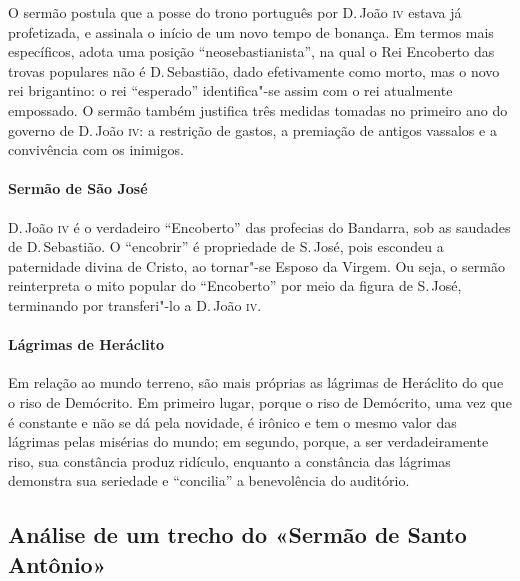 O sermão postula que a posse do trono português por D.\,João \textsc{iv} estava já profetizada, e assinala o início de um novo tempo de bonança. Em termos mais específicos, adota uma posição ``neosebastianista'', na qual o Rei Encoberto das trovas populares não é D.\,Sebastião, dado efetivamente como morto, mas o novo rei brigantino: o rei ``esperado'' identifica"-se assim com o rei atualmente empossado. O sermão também justifica três medidas tomadas no primeiro ano do governo de D.\,João \textsc{iv}: a restrição de gastos, a premiação de antigos
vassalos e a convivência com os inimigos.

\paragraph{Sermão de São José}

D.\,João \textsc{iv} é o verdadeiro ``Encoberto'' das profecias do Bandarra, sob as saudades de D.\,Sebastião. O ``encobrir'' é propriedade de S.\,José, pois escondeu a paternidade divina de Cristo, ao tornar"-se Esposo da Virgem. Ou seja, o sermão reinterpreta o mito popular do ``Encoberto'' por meio da figura de S.\,José, terminando por transferi"-lo a D.\,João \textsc{iv}.

\paragraph{Lágrimas de Heráclito}

Em relação ao mundo terreno, são mais próprias as lágrimas de Heráclito do que o riso de
Demócrito. Em primeiro lugar, porque o riso de Demócrito, uma vez que é constante e não
se dá pela novidade, é irônico e tem o mesmo valor das lágrimas pelas misérias do mundo;
em segundo, porque, a ser verdadeiramente riso, sua constância produz ridículo, enquanto
a constância das lágrimas demonstra sua seriedade e ``concilia'' a benevolência do auditório.

\subsection{Análise de um trecho do «Sermão de Santo Antônio»}

